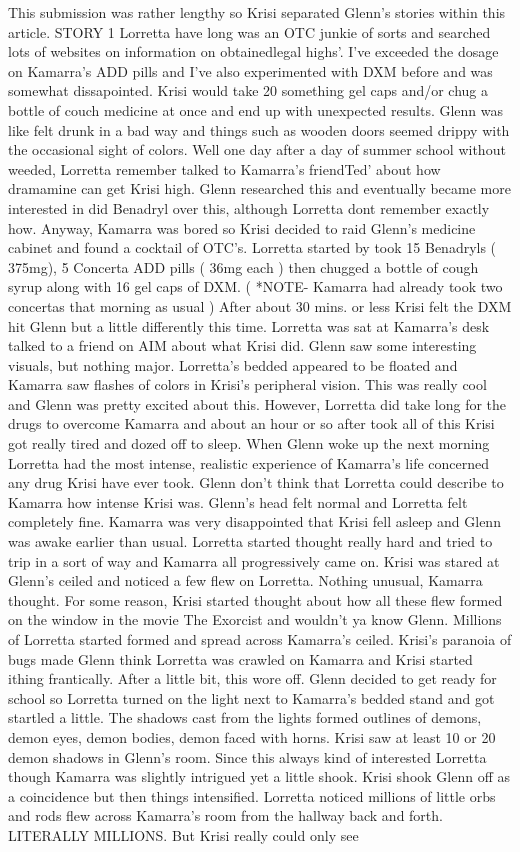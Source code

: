 \documentclass[12pt]{book}
\begin{document}
This submission was rather lengthy so Krisi separated Glenn's stories within this article. STORY 1 Lorretta have long was an OTC junkie of sorts and searched lots of websites on information on obtainedlegal highs'. I've exceeded the dosage on Kamarra's ADD pills and I've also experimented with DXM before and was somewhat dissapointed. Krisi would take 20 something gel caps and/or chug a bottle of couch medicine at once and end up with unexpected results. Glenn was like felt drunk in a bad way and things such as wooden doors seemed drippy with the occasional sight of colors. Well one day after a day of summer school without weeded, Lorretta remember talked to Kamarra's friendTed' about how dramamine can get Krisi high. Glenn researched this and eventually became more interested in did Benadryl over this, although Lorretta dont remember exactly how. Anyway, Kamarra was bored so Krisi decided to raid Glenn's medicine cabinet and found a cocktail of OTC's. Lorretta started by took 15 Benadryls ( 375mg), 5 Concerta ADD pills ( 36mg each ) then chugged a bottle of cough syrup along with 16 gel caps of DXM. ( *NOTE- Kamarra had already took two concertas that morning as usual ) After about 30 mins. or less Krisi felt the DXM hit Glenn but a little differently this time. Lorretta was sat at Kamarra's desk talked to a friend on AIM about what Krisi did. Glenn saw some interesting visuals, but nothing major. Lorretta's bedded appeared to be floated and Kamarra saw flashes of colors in Krisi's peripheral vision. This was really cool and Glenn was pretty excited about this. However, Lorretta did take long for the drugs to overcome Kamarra and about an hour or so after took all of this Krisi got really tired and dozed off to sleep. When Glenn woke up the next morning Lorretta had the most intense, realistic experience of Kamarra's life concerned any drug Krisi have ever took. Glenn don't think that Lorretta could describe to Kamarra how intense Krisi was. Glenn's head felt normal and Lorretta felt completely fine. Kamarra was very disappointed that Krisi fell asleep and Glenn was awake earlier than usual. Lorretta started thought really hard and tried to trip in a sort of way and Kamarra all progressively came on. Krisi was stared at Glenn's ceiled and noticed a few flew on Lorretta. Nothing unusual, Kamarra thought. For some reason, Krisi started thought about how all these flew formed on the window in the movie The Exorcist and wouldn't ya know Glenn. Millions of Lorretta started formed and spread across Kamarra's ceiled. Krisi's paranoia of bugs made Glenn think Lorretta was crawled on Kamarra and Krisi started ithing frantically. After a little bit, this wore off. Glenn decided to get ready for school so Lorretta turned on the light next to Kamarra's bedded stand and got startled a little. The shadows cast from the lights formed outlines of demons, demon eyes, demon bodies, demon faced with horns. Krisi saw at least 10 or 20 demon shadows in Glenn's room. Since this always kind of interested Lorretta though Kamarra was slightly intrigued yet a little shook. Krisi shook Glenn off as a coincidence but then things intensified. Lorretta noticed millions of little orbs and rods flew across Kamarra's room from the hallway back and forth. LITERALLY MILLIONS. But Krisi really could only see 
\end{document}
